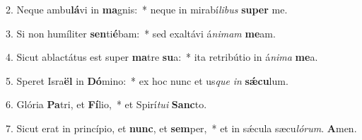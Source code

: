 2. Neque ambu\textbf{lá}vi in \textbf{ma}gnis:~*  neque in mirabí\textit{li}\textit{bus} \textbf{su}\textbf{per} me.\

3. Si non humíliter \textbf{sen}ti\textbf{é}bam:~*  sed exaltávi á\textit{ni}\textit{mam} \textbf{me}am.\

4. Sicut ablactátus est super \textbf{ma}tre \textbf{su}a:~*  ita retribútio in á\textit{ni}\textit{ma} \textbf{me}a.\

5. Speret Isra\textbf{ël} in \textbf{Dó}mino:~*  ex hoc nunc et us\textit{que} \textit{in} \textbf{sǽ}\textbf{cu}lum.\

6. Glória \textbf{Pa}tri, et \textbf{Fí}lio,~*  et Spirí\textit{tu}\textit{i} \textbf{Sanc}to.\

7. Sicut erat in princípio, et \textbf{nunc}, et \textbf{sem}per,~*  et in sǽcula sæcu\textit{ló}\textit{rum}. \textbf{A}men.\

